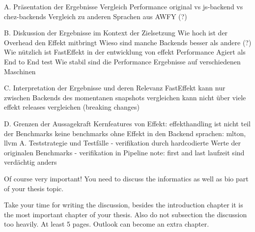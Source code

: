 		
A. Präsentation der Ergebnisse
    Vergleich Performance original vs js-backend vs chez-backends
    Vergleich zu anderen Sprachen aus AWFY (?)
    
B. Diskussion der Ergebnisse im Kontext der Zielsetzung
    Wie hoch ist der Overhead den Effekt mitbringt
    Wieso sind manche Backends besser als andere (?)
    Wie nützlich ist FastEffekt in der entwicklung von effekt
        Performance
        Agiert als End to End test
    Wie stabil sind die Performance Ergebnisse auf verschiedenen Maschinen
    
C. Interpretation der Ergebnisse und deren Relevanz
    FastEffekt kann nur zwischen Backends des momentanen snapshots vergleichen
    kann nicht über viele effekt releases vergleichen (breaking changes)

D. Grenzen der Aussagekraft
    Kernfeatures von Effekt: effekthandling ist nicht teil der Benchmarks
    keine benchmarks ohne Effekt in den Backend sprachen: mlton, llvm
    A. Teststrategie und Testfälle
        - verifikation durch hardcodierte Werte der originalen Benchmarks
        - verifikation in Pipeline	
        note: first and last laufzeit sind verdächtig anders

Of course very important! You need to discuss the informatics as well as bio part of your thesis topic.

\bigskip
Take your time for writing the discussion, besides the introduction chapter it is the most important chapter of your thesis.
Also do not subsection the discussion too heavily.
At least 5 pages.
Outlook can become an extra chapter.
